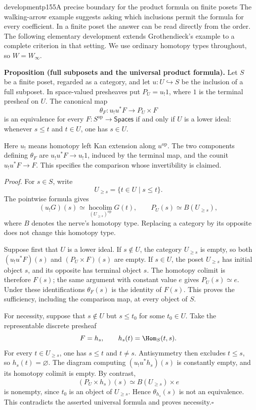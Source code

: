 \begin{dcomment}{development}{p155}{A precise boundary for the product formula on finite posets}
The walking-arrow example suggests asking which inclusions permit the formula for every coefficient. In a finite poset the answer can be read directly from the order. The following elementary development extends Grothendieck's example to a complete criterion in that setting. We use ordinary homotopy types throughout, so $W=W_\infty$.

\textbf{Proposition (full subposets and the universal product formula).}\ours
Let $S$ be a finite poset, regarded as a category, and let $u:U\hookrightarrow S$ be the inclusion of a full subposet. In space-valued presheaves put $P_U=u_!1$, where $1$ is the terminal presheaf on $U$. The canonical map
\[
 \theta_F:u_!u^*F\longrightarrow P_U\times F
\]
is an equivalence for every $F:S^{\mathrm{op}}\longrightarrow\mathsf{Spaces}$ if and only if $U$ is a lower ideal: whenever $s\le t$ and $t\in U$, one has $s\in U$.

Here $u_!$ means homotopy left Kan extension along $u^{\mathrm{op}}$. The two components defining $\theta_F$ are $u_!u^*F\longrightarrow u_!1$, induced by the terminal map, and the counit $u_!u^*F\longrightarrow F$. This specifies the comparison whose invertibility is claimed.

\emph{Proof.} For $s\in S$, write
\[
 U_{\ge s}=\{t\in U\mid s\le t\}.
\]
The pointwise formula gives
\[
 (u_!G)(s)\simeq
 \operatorname*{hocolim}_{(U_{\ge s})^{\mathrm{op}}}G(t),
 \qquad
 P_U(s)\simeq B(U_{\ge s}),
\]
where $B$ denotes the nerve's homotopy type. Replacing a category by its opposite does not change this homotopy type.

Suppose first that $U$ is a lower ideal. If $s\notin U$, the category $U_{\ge s}$ is empty, so both $(u_!u^*F)(s)$ and $(P_U\times F)(s)$ are empty. If $s\in U$, the poset $U_{\ge s}$ has initial object $s$, and its opposite has terminal object $s$. The homotopy colimit is therefore $F(s)$; the same argument with constant value $e$ gives $P_U(s)\simeq e$. Under these identifications $\theta_F(s)$ is the identity of $F(s)$. This proves the sufficiency, including the comparison map, at every object of $S$.

For necessity, suppose that $s\notin U$ but $s\le t_0$ for some $t_0\in U$. Take the representable discrete presheaf
\[
 F=h_s,\qquad h_s(t)=\Hom_S(t,s).
\]
For every $t\in U_{\ge s}$, one has $s\le t$ and $t\ne s$. Antisymmetry then excludes $t\le s$, so $h_s(t)=\varnothing$. The diagram computing $(u_!u^*h_s)(s)$ is constantly empty, and its homotopy colimit is empty. By contrast,
\[
 (P_U\times h_s)(s)\simeq B(U_{\ge s})\times e
\]
is nonempty, since $t_0$ is an object of $U_{\ge s}$. Hence $\theta_{h_s}(s)$ is not an equivalence. This contradicts the asserted universal formula and proves necessity.\hfill$\square$


\end{dcomment}
